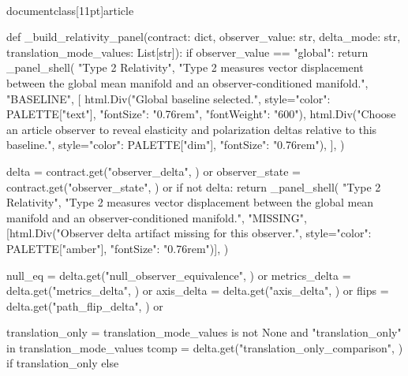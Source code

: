 \\documentclass[11pt]{article}
\begin{document}
\begin{CodeBlock}
{{{{{{{{def _build_relativity_panel(contract: dict, observer_value: str, delta_mode: str, translation_mode_values: List[str]):
    if observer_value == "global":
        return _panel_shell(
            "Type 2 Relativity",
            "Type 2 measures vector displacement between the global mean manifold and an observer-conditioned manifold.",
            "BASELINE",
            [
                html.Div("Global baseline selected.", style={"color": PALETTE["text"], "fontSize": "0.76rem", "fontWeight": "600"}),
                html.Div("Choose an article observer to reveal elasticity and polarization deltas relative to this baseline.", style={"color": PALETTE["dim"], "fontSize": "0.76rem"}),
            ],
        )

    delta = contract.get("observer_delta", {}) or {}
    observer_state = contract.get("observer_state", {}) or {}
    if not delta:
        return _panel_shell(
            "Type 2 Relativity",
            "Type 2 measures vector displacement between the global mean manifold and an observer-conditioned manifold.",
            "MISSING",
            [html.Div("Observer delta artifact missing for this observer.", style={"color": PALETTE["amber"], "fontSize": "0.76rem"})],
        )

    null_eq = delta.get("null_observer_equivalence", {}) or {}
    metrics_delta = delta.get("metrics_delta", {}) or {}
    axis_delta = delta.get("axis_delta", {}) or {}
    flips = delta.get("path_flip_delta", {}) or {}

    translation_only = translation_mode_values is not None and "translation_only" in translation_mode_values
    tcomp = delta.get("translation_only_comparison", {}) if translation_only else {}

}}}}}}}}
\end{CodeBlock}
\end{document}
